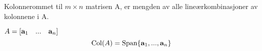 Kolonnerommet til $m\times n$ matrisen A,
er mengden av alle lineærkombinasjoner av kolonnene i A.

$A = [\mathbf{a}_1\quad ...\quad \mathbf{a}_n]$
$$\text{Col}(A) = \text{Span}\{\mathbf{a}_1, ..., \mathbf{a}_n\}$$
